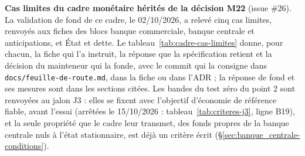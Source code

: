 \documentclass[11pt,a4paper]{article}
\begin{document}
\textbf{Cas limites du cadre monétaire hérités de la décision M22} (issue \#26). La validation de fond de ce cadre, le 02/10/2026, a relevé cinq cas limites, renvoyés aux fiches des blocs banque commerciale, banque centrale et anticipations, et État et dette. Le tableau~\ref{tab:cadre-cas-limites} donne, pour chacun, la fiche qui l'a instruit, la réponse que la spécification retient et la décision du mainteneur qui la fonde, avec le commit qui la consigne dans \nolinkurl{docs/feuille-de-route.md}, dans la fiche ou dans l'ADR ; la réponse de fond et ses mesures sont dans les sections citées. Les bandes du test zéro du point 2 sont renvoyées au jalon J3 : elles se fixent avec l'objectif d'économie de référence fiable, avant l'essai (arrêtées le 15/10/2026 : tableau~\ref{tab:criteres-j3}, ligne B19), et la seule propriété que le cadre leur transmet, des fonds propres de la banque centrale nuls à l'état stationnaire, est déjà un critère écrit (\S\ref{sec:banque_centrale-conditions}).
\end{document}
